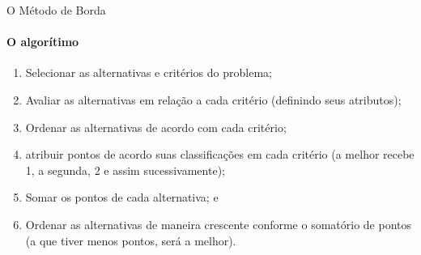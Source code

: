 \documentclass[aspectratio=169]{beamer}
\begin{document}
\begin{frame}{O Método de Borda}
\framesubtitle{O algorítimo}
   \begin{enumerate}
       \item Selecionar as alternativas e critérios do problema;
       \item Avaliar as alternativas em relação a cada critério (definindo seus atributos);
       \item Ordenar as alternativas de acordo com cada critério;
       \item atribuir pontos de acordo suas classificações em cada critério (a melhor recebe 1, a segunda, 2 e assim sucessivamente);
       \item Somar os pontos de cada alternativa; e
       \item Ordenar as alternativas de maneira crescente conforme o somatório de pontos (a que tiver menos pontos, será a melhor).
   \end{enumerate}
\end{frame}
\end{document}
